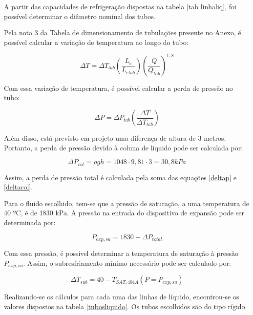 \documentclass[10pt,a4paper]{article}
\begin{document}
A partir das capacidades de refrigeração dispostas na tabela \ref{tab linhaliq}, foi possível determinar o diâmetro nominal dos tubos.

Pela nota 3 da Tabela de dimensionamento de tubulações presente no Anexo, é possível calcular a variação de temperatura ao longo do tubo:

\begin{equation}\label{deltat}
   \Delta T = \Delta T_{tab} (\frac{L_e}{L_{etab}}) (\frac{Q}{Q_{tab}})^{1,8}
\end{equation}

Com essa variação de temperatura, é possível calcular a perda de pressão no tubo:

\begin{equation}\label{deltap}
   \Delta P = \Delta P_{tab} (\frac{\Delta T}{\Delta T_{tab}})
\end{equation}

Além disso, está previsto em projeto uma diferença de altura de 3 metros. Portanto, a perda de pressão devido à coluna de líquido pode ser calculada por:

\begin{equation}\label{deltacol}
   \Delta P_{col} = \rho g h = 1048 \cdot 9,81 \cdot 3 = 30,8 kPa
\end{equation}

Assim, a perda de pressão total é calculada pela soma das equações \ref{deltap} e \ref{deltacol}.

Para o fluido escolhido, tem-se que a pressão de saturação, a uma temperatura de 40 ºC, é de 1830 kPa. A pressão na entrada do dispositivo de expansão pode ser determinada por:

\begin{equation}\label{pexp}
   P_{exp,su} = 1830 - \Delta P_{total}
\end{equation}

Com essa pressão, é possível determinar a temperatura de saturação à pressão $P_{exp,su}$. Assim, o subresfriamento mínimo necessário pode ser calculado por:

\begin{equation}\label{deltasub}
  \Delta T_{sub} = 40 - T_{SAT, 404A} (P = P_{exp,su})
\end{equation}

Realizando-se os cálculos para cada uma das linhas de líquido, encontrou-se os valores dispostos na tabela \ref{tubosliquido}. Os tubos escolhidos são do tipo rígido.
\end{document}
